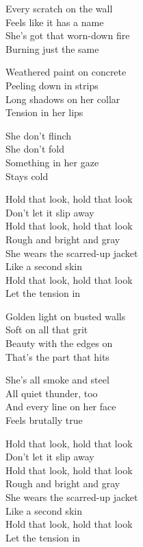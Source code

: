 \begin{lyrics}
Every scratch on the wall\\
Feels like it has a name\\
She’s got that worn-down fire\\
Burning just the same

Weathered paint on concrete\\
Peeling down in strips\\
Long shadows on her collar\\
Tension in her lips

She don’t flinch\\
She don’t fold\\
Something in her gaze\\
Stays cold

Hold that look, hold that look\\
Don’t let it slip away\\
Hold that look, hold that look\\
Rough and bright and gray\\
She wears the scarred-up jacket\\
Like a second skin\\
Hold that look, hold that look\\
Let the tension in

Golden light on busted walls\\
Soft on all that grit\\
Beauty with the edges on\\
That’s the part that hits

She’s all smoke and steel\\
All quiet thunder, too\\
And every line on her face\\
Feels brutally true

Hold that look, hold that look\\
Don’t let it slip away\\
Hold that look, hold that look\\
Rough and bright and gray\\
She wears the scarred-up jacket\\
Like a second skin\\
Hold that look, hold that look\\
Let the tension in
\end{lyrics}

